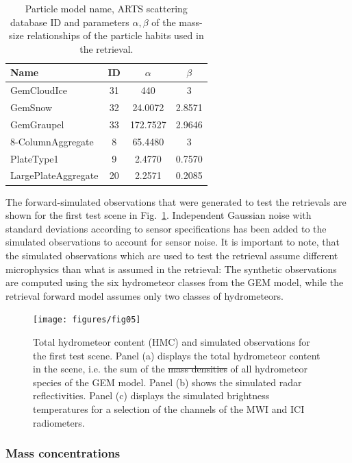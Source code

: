 \documentclass[journal abbreviation, manuscript]{copernicus}
\providecommand{\DIFadd}[1]{{\protect\color{blue}\uwave{#1}}} %
\providecommand{\DIFdel}[1]{{\protect\color{red}\sout{#1}}}                      %
\providecommand{\DIFaddFL}[1]{\DIFadd{#1}} %
\providecommand{\DIFdelFL}[1]{\DIFdel{#1}} %
\providecommand{\DIFaddbeginFL}{} %
\providecommand{\DIFaddendFL}{} %
\providecommand{\DIFdelbeginFL}{} %
\providecommand{\DIFdelendFL}{} %
\begin{document}
\begin{table}
  \centering
  \caption{Particle model name, ARTS scattering database ID and parameters
    $\alpha, \beta$ of the mass-size relationships of the particle habits used
    in the retrieval.}
  \begin{tabular}{l|c|c|c}
    Name & ID & $\alpha$ & $\beta$ \\
    \hline
    GemCloudIce         & 31  & 440      & 3 \\
    GemSnow             & 32  & 24.0072  & 2.8571 \\
    GemGraupel          & 33  & 172.7527 & 2.9646 \\
    8-ColumnAggregate   &  8  & 65.4480  & 3      \\
    PlateType1          &  9  & 2.4770   & 0.7570 \\
    LargePlateAggregate &  20 & 2.2571   & 0.2085 \\
  \end{tabular}
  \label{tab:particles_retrieval}
\end{table}

The forward-simulated observations that were generated to test the retrievals
are shown for the first test scene in Fig.~\ref{fig:observations_a}. Independent
Gaussian noise with standard deviations according to sensor specifications has
been added to the simulated observations to account for sensor noise. It is
important to note, that the simulated observations which are used to test the
retrieval assume different microphysics than what is assumed in the retrieval:
The synthetic observations are computed using the six hydrometeor classes from
the GEM model, while the retrieval forward model assumes only two classes of
hydrometeors.

\begin{figure}
\centering
\texttt{[image: figures/fig05]}
\caption{Total hydrometeor content (HMC) and simulated observations for the first test
  scene. Panel (a) displays the total hydrometeor content in the scene, i.e. the
  sum of the \DIFdelbeginFL \DIFdelFL{mass densities }\DIFdelendFL \DIFaddbeginFL \DIFaddFL{water content }\DIFaddendFL of all hydrometeor species of the GEM model. Panel
  (b) shows the simulated radar reflectivities. Panel (c) displays the simulated
  brightness temperatures for a selection of the channels of the MWI and ICI
  radiometers.}
\label{fig:observations_a}
\end{figure}

\subsubsection{Mass concentrations}
\end{document}
